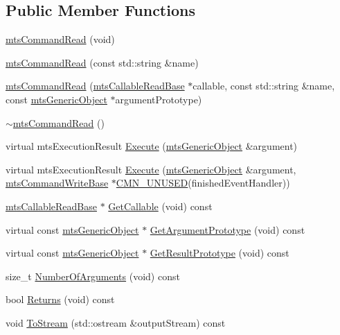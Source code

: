 \subsection*{Public Member Functions}
\begin{DoxyCompactItemize}
\item 
\hyperlink{classmts_command_read_ab7638c37f1324419aecfd630c1956242}{mts\+Command\+Read} (void)
\item 
\hyperlink{classmts_command_read_a3284698af9e589017a99d01c106d134f}{mts\+Command\+Read} (const std\+::string \&name)
\item 
\hyperlink{classmts_command_read_ad1fd48cbf7eef09ec6b6ac949cf07266}{mts\+Command\+Read} (\hyperlink{classmts_callable_read_base}{mts\+Callable\+Read\+Base} $\ast$callable, const std\+::string \&name, const \hyperlink{classmts_generic_object}{mts\+Generic\+Object} $\ast$argument\+Prototype)
\item 
\hyperlink{classmts_command_read_a0bec5b8aab94dc7bc4bd0334592b773a}{$\sim$mts\+Command\+Read} ()
\item 
virtual mts\+Execution\+Result \hyperlink{classmts_command_read_ac7186f6e12418c551c483105719a8a38}{Execute} (\hyperlink{classmts_generic_object}{mts\+Generic\+Object} \&argument)
\item 
virtual mts\+Execution\+Result \hyperlink{classmts_command_read_ae5df5d5a093d4c465b3a6d3092755305}{Execute} (\hyperlink{classmts_generic_object}{mts\+Generic\+Object} \&argument, \hyperlink{classmts_command_write_base}{mts\+Command\+Write\+Base} $\ast$\hyperlink{cmn_portability_8h_a021894e2626935fa2305434b1e893ff6}{C\+M\+N\+\_\+\+U\+N\+U\+S\+E\+D}(finished\+Event\+Handler))
\item 
\hyperlink{classmts_callable_read_base}{mts\+Callable\+Read\+Base} $\ast$ \hyperlink{classmts_command_read_a0787cf1a8fa82d5bef0e904fce8a1b94}{Get\+Callable} (void) const 
\item 
virtual const \hyperlink{classmts_generic_object}{mts\+Generic\+Object} $\ast$ \hyperlink{classmts_command_read_af68b3e7a6e6a32759affbbd6a6715a72}{Get\+Argument\+Prototype} (void) const 
\item 
virtual const \hyperlink{classmts_generic_object}{mts\+Generic\+Object} $\ast$ \hyperlink{classmts_command_read_a799a502c2c5bfa07a1eb65bd69c72ed7}{Get\+Result\+Prototype} (void) const 
\item 
size\+\_\+t \hyperlink{classmts_command_read_ae3cd3d0b3aded18cc412ba2727ba1d65}{Number\+Of\+Arguments} (void) const 
\item 
bool \hyperlink{classmts_command_read_a375ea296870810376b01474297efff64}{Returns} (void) const 
\item 
void \hyperlink{classmts_command_read_a7790e415f816894d2a97ba1358848f19}{To\+Stream} (std\+::ostream \&output\+Stream) const 
\end{DoxyCompactItemize}
